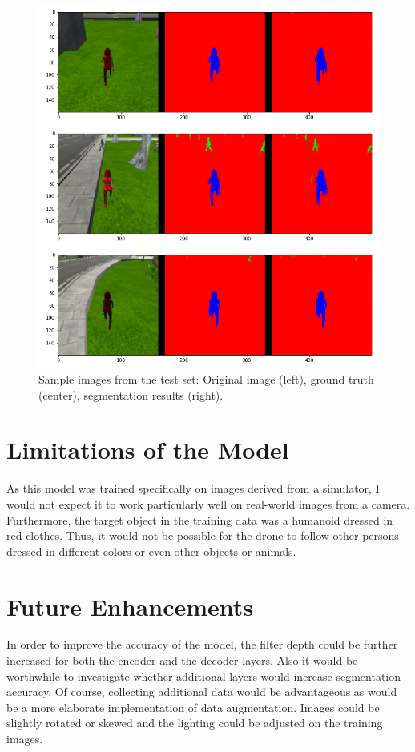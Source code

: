 \documentclass[twoside, twocolumn]{article}
\begin{document}
\begin{figure}[ht]
\centering
\includegraphics[width=\columnwidth]{fig/segmentation_examples.png}
\caption{\label{fig:segmentation_examples} Sample images from the test set:
Original image (left), ground truth (center), segmentation results (right).}
\end{figure}





\section{Limitations of the Model}
As this model was trained specifically on images derived from a simulator, I would
not expect it to work particularly well on real-world images from a camera. Furthermore,
the target object in the training data was a humanoid dressed in red clothes. Thus,
it would not be possible for the drone to follow other persons dressed in different colors or
even other objects or animals.


\section{Future Enhancements}
In order to improve the accuracy of the model, the filter depth could be further increased
for both the encoder and the decoder layers. Also it would be worthwhile to investigate
whether additional layers would increase segmentation accuracy. Of course, collecting
additional data would be advantageous as would be a more elaborate implementation
of data augmentation. Images could be slightly rotated or skewed and the lighting could be
adjusted on the training images.
\end{document}
